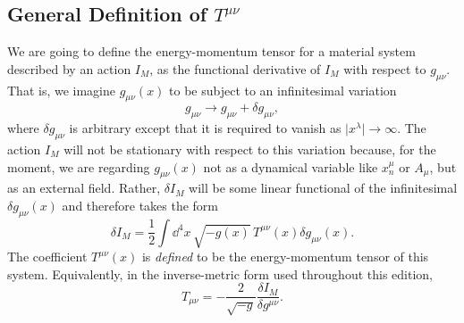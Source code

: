 %

\subsection{General Definition of
  \texorpdfstring{\(T^{\mu\nu}\)}{T mu nu}}\label{sec:12.2}

We are going to define the energy-momentum tensor for a material system
described by an action \(I_M\), as the functional derivative of \(I_M\) with
respect to \(g_{\mu\nu}\). That is, we imagine \(g_{\mu\nu}(x)\) to be subject
to an infinitesimal variation
\begin{equation}
  g_{\mu\nu}\longrightarrow g_{\mu\nu}+\delta g_{\mu\nu},
  \tag{12.2.1}\label{eq:12.2.1}
\end{equation}
where \(\delta g_{\mu\nu}\) is arbitrary except that it is required to vanish
as \(\lvert x^\lambda\rvert\longrightarrow\infty\). The action \(I_M\) will
not be stationary with respect to this variation because, for the moment, we
are regarding \(g_{\mu\nu}(x)\) not as a dynamical variable like
\(x_n^\mu\) or \(A_\mu\), but as an external field. Rather, \(\delta I_M\)
will be some linear functional of the infinitesimal \(\delta g_{\mu\nu}(x)\)
and therefore takes the form
\begin{equation}
  \delta I_M
  =
  \frac12\int\dd^4x\,\sqrt{-g(x)}\,
  T^{\mu\nu}(x)\delta g_{\mu\nu}(x).
  \tag{12.2.2}\label{eq:12.2.2}
\end{equation}
The coefficient \(T^{\mu\nu}(x)\) is \emph{defined} to be the
energy-momentum tensor of this system. Equivalently, in the inverse-metric
form used throughout this edition,
\[
  T_{\mu\nu}
  =
  -\frac{2}{\sqrt{-g}}\frac{\delta I_M}{\delta g^{\mu\nu}}.
\]

